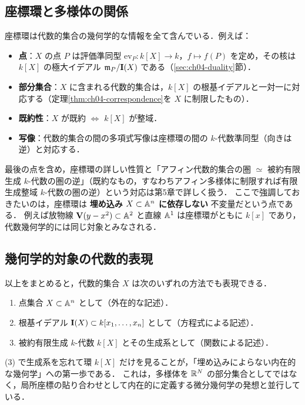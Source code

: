 \subsection{座標環と多様体の関係}

座標環は代数的集合の幾何学的な情報を全て含んでいる．例えば：
\begin{itemize}
  \item \textbf{点}：$X$ の点 $P$ は評価準同型 $\mathrm{ev}_P\colon k[X]\to k$，$f\mapsto f(P)$ を定め，その核は $k[X]$ の極大イデアル $\mathfrak{m}_P/\mathbf{I}(X)$ である（\ref{sec:ch04-duality}節）．
  \item \textbf{部分集合}：$X$ に含まれる代数的集合は，$k[X]$ の根基イデアルと一対一に対応する（定理\ref{thm:ch04-correspondence}を $X$ に制限したもの）．
  \item \textbf{既約性}：$X$ が既約 $\iff$ $k[X]$ が整域．
  \item \textbf{写像}：代数的集合の間の多項式写像は座標環の間の $k$-代数準同型（向きは逆）と対応する．
\end{itemize}
最後の点を含め，座標環の詳しい性質と「アフィン代数的集合の圏 $\simeq$ 被約有限生成 $k$-代数の圏の逆」（既約なもの，すなわちアフィン多様体に制限すれば有限生成整域 $k$-代数の圏の逆）という対応は第5章で詳しく扱う．
ここで強調しておきたいのは，座標環は \textbf{埋め込み $X\subset\mathbb{A}^n$ に依存しない} 不変量だという点である．
例えば放物線 $\mathbf{V}(y-x^2)\subset\mathbb{A}^2$ と直線 $\mathbb{A}^1$ は座標環がともに $k[x]$ であり，代数幾何学的には同じ対象とみなされる．

\subsection{幾何学的対象の代数的表現}

以上をまとめると，代数的集合 $X$ は次のいずれの方法でも表現できる．
\begin{enumerate}
  \item 点集合 $X\subset\mathbb{A}^n$ として（外在的な記述）．
  \item 根基イデアル $\mathbf{I}(X)\subset k[x_1,\dots,x_n]$ として（方程式による記述）．
  \item 被約有限生成 $k$-代数 $k[X]$ とその生成系として（関数による記述）．
\end{enumerate}
(3) で生成系を忘れて環 $k[X]$ だけを見ることが，「埋め込みによらない内在的な幾何学」への第一歩である．
これは，多様体を $\mathbb{R}^N$ の部分集合としてではなく，局所座標の貼り合わせとして内在的に定義する微分幾何学の発想と並行している．

